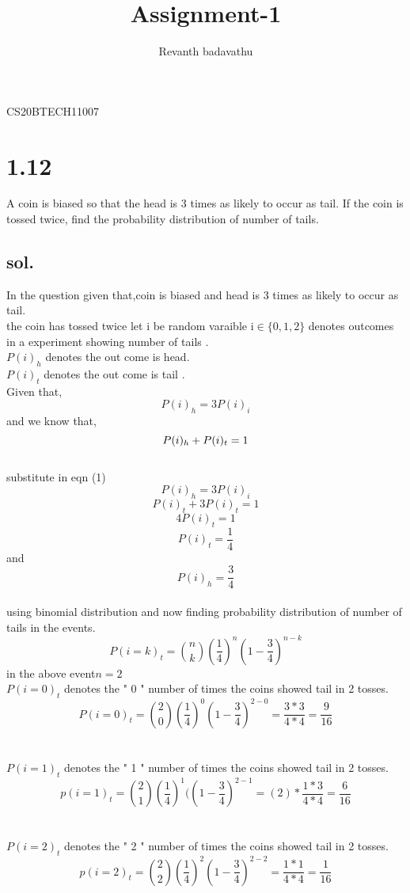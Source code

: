 \documentclass[14pt]{article}
\begin{document}
\title{Assignment-1}
\author{Revanth badavathu}
\maketitle
\begin{center}
CS20BTECH11007
\end{center}
\section*{1.12}A coin is biased so that the head is 3 times
as likely to occur as tail. If the coin is tossed
twice, find the probability distribution of
number of tails.\\

\subsection*{sol.}
 In the question given that,coin is biased and head is 3 times as likely to occur as tail.\\
the coin has tossed twice 
let i be random varaible i$\in\{0,1,2 \}$ denotes outcomes  in a experiment showing number of tails .\\
$P(i)_h$   denotes the out come is head.\\
$P(i)_t$    denotes the out come is tail .\\
Given that,$$P(i)_h=3P(i)_i$$
and we know that,
\begin{equation}
 P(i)_{h} +P(i)_{t}=1\\
\end{equation}\\

substitute in eqn (1)$$P(i)_h=3P(i)_i $$ 
$$P(i)_t+3P(i)_t=1$$
$$4P(i)_t=1$$
$$ P(i)_t=\frac{1}{4}$$
and $$P(i)_h=\frac{3}{4}$$\\
  using  binomial distribution and now finding  probability distribution of number of tails in the events.\\
$$ P(i=k)_t={n \choose k}( \frac{1}{4})^{n} (1-\frac{3}{4}) ^{n-k}$$
in the above event$ n=2$\\
$P(i=0)_t $ denotes the " 0 " number of times the coins showed tail in 2 tosses.\\
$$ P(i=0)_t={2 \choose 0}( \frac{1}{4})^{0} (1-\frac{3}{4}) ^{2-0}=\frac{3*3}{4*4}=\frac{9}{16}$$\\
\\$P(i=1)_t $ denotes the " 1 " number of times the coins showed tail in 2 tosses.\\
$$p(i=1)_t={2 \choose 1}(\frac{1}{4} )^{1} ((1-\frac{3}{4}) ^{2-1}=(2)*{\frac{1*3}{4*4}}=\frac{6}{16}$$\\
\\$P(i=2)_t $ denotes the " 2 " number of times the coins showed tail in 2 tosses.\\
$$p(i=2)_t={2 \choose 2}( \frac{1}{4})^{2} (1-\frac{3}{4}) ^{2-2}=\frac{1*1}{4*4}=\frac{1}{16}$$\\
\end{document}
